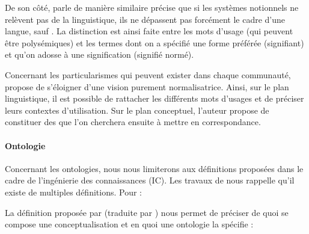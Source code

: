 De son côté, \cite[\S 2.4]{Roche2005} parle de manière similaire 
\citeauthor{Roche2005} précise que si les systèmes notionnels ne relèvent pas de la linguistique, ils ne dépassent pas forcément le cadre d'une langue, sauf .
La distinction est ainsi faite entre les mots d'usage (qui peuvent être polysémiques) et les termes dont on a spécifié une forme préférée (signifiant) et qu'on adosse à une signification (signifié normé).  

Concernant les particularismes qui peuvent exister dans chaque communauté, \citeauthor{Roche2005} propose de s'éloigner d'une vision purement normalisatrice. 
Ainsi, sur le plan linguistique, il est possible de rattacher les différents mots d'usages et de préciser leurs contextes d'utilisation.
Sur le plan conceptuel, l'auteur propose de constituer des  que l'on cherchera ensuite à mettre en correspondance. 




\paragraph{Ontologie}
Concernant les ontologies, nous nous limiterons aux définitions proposées dans le cadre de l'ingénierie des connaissances (IC). Les travaux de \cite{Charlet2002} nous rappelle qu'il existe de multiples définitions. Pour \cite{Gruber1993} : 


 La définition proposée par \cite{Uschold1996} (traduite par \citeauthor{Charlet2002}) nous permet de préciser de quoi se compose une conceptualisation et en quoi une ontologie la spécifie : 



